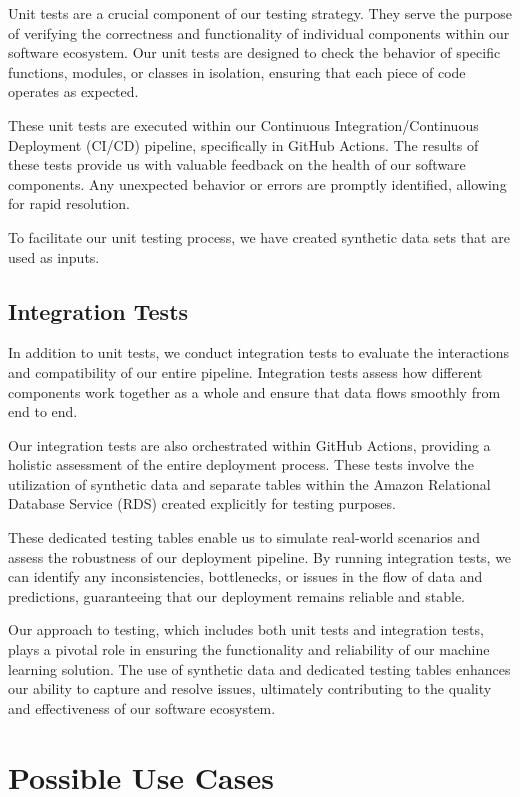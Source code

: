 \documentclass{report}
\begin{document}
Unit tests are a crucial component of our testing strategy. They serve the purpose of verifying the correctness and functionality of individual components within our software ecosystem. Our unit tests are designed to check the behavior of specific functions, modules, or classes in isolation, ensuring that each piece of code operates as expected.

These unit tests are executed within our Continuous Integration/Continuous Deployment (CI/CD) pipeline, specifically in GitHub Actions. The results of these tests provide us with valuable feedback on the health of our software components. Any unexpected behavior or errors are promptly identified, allowing for rapid resolution.

To facilitate our unit testing process, we have created synthetic data sets that are used as inputs.

\section{Integration Tests}

In addition to unit tests, we conduct integration tests to evaluate the interactions and compatibility of our entire pipeline. Integration tests assess how different components work together as a whole and ensure that data flows smoothly from end to end.

Our integration tests are also orchestrated within GitHub Actions, providing a holistic assessment of the entire deployment process. These tests involve the utilization of synthetic data and separate tables within the Amazon Relational Database Service (RDS) created explicitly for testing purposes.

These dedicated testing tables enable us to simulate real-world scenarios and assess the robustness of our deployment pipeline. By running integration tests, we can identify any inconsistencies, bottlenecks, or issues in the flow of data and predictions, guaranteeing that our deployment remains reliable and stable.

Our approach to testing, which includes both unit tests and integration tests, plays a pivotal role in ensuring the functionality and reliability of our machine learning solution. The use of synthetic data and dedicated testing tables enhances our ability to capture and resolve issues, ultimately contributing to the quality and effectiveness of our software ecosystem.

\chapter{Possible Use Cases}
\end{document}
